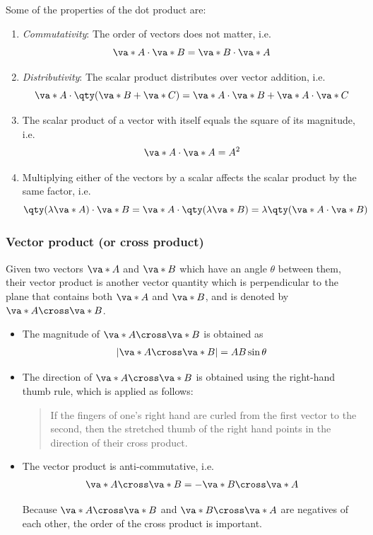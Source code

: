 			Some of the properties of the dot product are:
			\begin{enumerate}
				\item \textit{Commutativity}: The order of vectors does not matter, i.e.
				$$\va*{A}\cdot\va*{B}=\va*{B}\cdot\va*{A}$$
				
				\item \textit{Distributivity}: The scalar product distributes over vector addition, i.e.
				$$\va*{A}\cdot\qty(\va*{B}+\va*{C})=\va*{A}\cdot\va*{B}+\va*{A}\cdot\va*{C}$$
				
				\item The scalar product of a vector with itself equals the square of its magnitude, i.e.
				$$\va*{A}\cdot\va*{A}=A^2$$
				
				\item Multiplying either of the vectors by a scalar affects the scalar product by the same factor, i.e.
				$$\qty(\lambda\va*{A})\cdot\va*{B}=\va*{A}\cdot\qty(\lambda\va*{B})=\lambda\qty(\va*{A}\cdot\va*{B})$$
			\end{enumerate}
			
		\subsubsection{Vector product (or cross product)}
			Given two vectors $\va*{A}$ and $\va*{B}$ which have an angle $\theta$ between them, their vector product is another vector quantity which is perpendicular to the plane that contains both $\va*{A}$ and $\va*{B}$, and is denoted by $\va*{A}\cross\va*{B}$.
			\renewcommand\labelitemi{--}
			\begin{itemize}
				\item The magnitude of $\va*{A}\cross\va*{B}$ is obtained as
				\begin{align*}
					|\va*{A}\cross\va*{B}|=AB\sin{\theta}
				\end{align*}
				
				\item The direction of $\va*{A}\cross\va*{B}$ is obtained using the right-hand thumb rule, which is applied as follows:
				
				\begin{quote}
					If the fingers of one's right hand are curled from the first vector to the second, then the stretched thumb of the right hand points in the direction of their cross product.
				\end{quote}
				
				\item The vector product is anti-commutative, i.e.
				\begin{align*}
					\va*{A}\cross\va*{B}=-\va*{B}\cross\va*{A}
				\end{align*}
				
				Because $\va*{A}\cross\va*{B}$ and $\va*{B}\cross\va*{A}$ are negatives of each other, the order of the cross product is important.
			\end{itemize}
			
